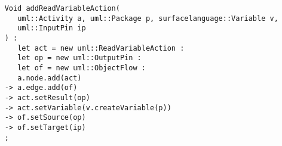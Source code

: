 \lstset{
    language=xtend,
    label=lst:grammars-and-metamodels:Xtend-ex,
    caption=\Xtend extension that adds a \ReadVariableAction to an \Activity,
    numbers=none
}

\begin{listing}
  \begin{lstlisting}
    Void addReadVariableAction(
       uml::Activity a, uml::Package p, surfacelanguage::Variable v,
       uml::InputPin ip
    ) :
       let act = new uml::ReadVariableAction :
       let op = new uml::OutputPin :
       let of = new uml::ObjectFlow :
       a.node.add(act)
    -> a.edge.add(of)
    -> act.setResult(op)
    -> act.setVariable(v.createVariable(p))
    -> of.setSource(op)
    -> of.setTarget(ip)
    ;
  \end{lstlisting}
\end{listing} 